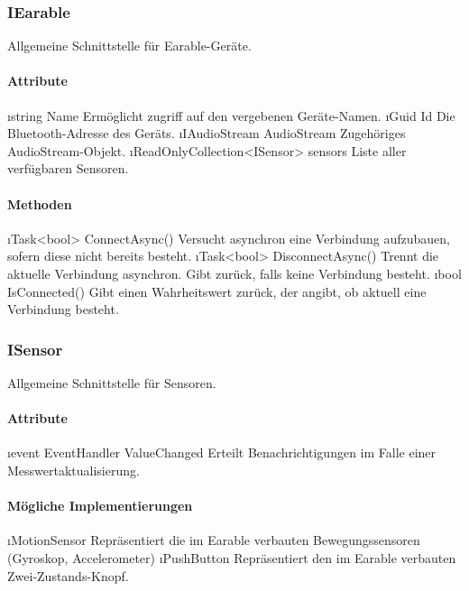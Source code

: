 \documentclass[../entwurf.tex]{subfiles}
\begin{document}
\subsubsection{IEarable}
Allgemeine Schnittstelle für Earable-Geräte.
\paragraph{Attribute}
\begin{itemize}
	\i{string Name} Ermöglicht zugriff auf den vergebenen Geräte-Namen.
	\i{Guid Id} Die Bluetooth-Adresse des Geräts.
	\i{IAudioStream AudioStream} Zugehöriges AudioStream-Objekt.
	\i{ReadOnlyCollection<ISensor> sensors} Liste aller verfügbaren Sensoren.
\end{itemize}
\paragraph{Methoden}
\begin{itemize}
	\i{Task<bool> ConnectAsync()} Versucht asynchron eine Verbindung aufzubauen, sofern diese nicht bereits besteht.
	\i{Task<bool> DisconnectAsync()} Trennt die aktuelle Verbindung asynchron. Gibt  zurück, falls keine Verbindung besteht.
	\i{bool IsConnected()} Gibt einen Wahrheitswert zurück, der angibt, ob aktuell eine Verbindung besteht.
\end{itemize}

\subsubsection{ISensor}
Allgemeine Schnittstelle für Sensoren.
\paragraph{Attribute}
\begin{itemize}
	\i{event EventHandler ValueChanged} Erteilt Benachrichtigungen im Falle einer Messwertaktualisierung.
\end{itemize}
\paragraph{Mögliche Implementierungen}
\begin{itemize}
	\i{MotionSensor} Repräsentiert die im Earable verbauten Bewegungssensoren (Gyroskop, Accelerometer)
	\i{PushButton} Repräsentiert den im Earable verbauten Zwei-Zustands-Knopf.
\end{itemize}
\end{document}
